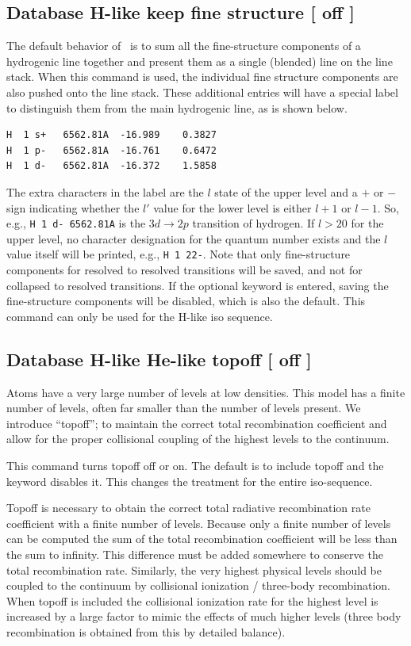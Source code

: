 \subsection{Database H-like keep fine structure [ off ]}

The default behavior of \Cloudy\ is to sum all the fine-structure components
of a hydrogenic line together and present them as a single (blended) line on
the line stack. When this command is used, the individual fine structure
components are also pushed onto the line stack. These additional entries will
have a special label to distinguish them from the main hydrogenic line, as is
shown below.

\begin{verbatim}
H  1 s+   6562.81A  -16.989    0.3827
H  1 p-   6562.81A  -16.761    0.6472
H  1 d-   6562.81A  -16.372    1.5858
\end{verbatim}

The extra characters in the label are the $l$ state of the upper level and a
$+$ or $-$ sign indicating whether the $l'$ value for the lower level is
either $l+1$ or $l-1$. So, e.g., \verb=H 1 d- 6562.81A= is the $3d \rightarrow
2p$ transition of hydrogen. If $l > 20$ for the upper level, no character
designation for the quantum number exists and the $l$ value itself will be
printed, e.g., \verb=H 1 22-=. Note that only fine-structure components for
resolved to resolved transitions will be saved, and not for collapsed to
resolved transitions. If the optional keyword  is entered,
saving the fine-structure components will be disabled, which is also the
default. This command can only be used for the H-like iso sequence.

\subsection{Database H-like \OR{} He-like topoff [ off ]} 

Atoms have a very large number of levels at low densities.
This model has a finite number of levels, often far smaller than
the number of levels present.
We introduce ``topoff''; to maintain the correct total recombination coefficient and
allow for the proper collisional coupling of the highest levels to the continuum.

This command turns topoff off or on.
The default is to include topoff and the keyword  disables it.
This changes the treatment for the entire iso-sequence.

Topoff is necessary to obtain the correct total
radiative recombination rate coefficient with a finite number of levels.
Because only a finite number of levels can be computed the sum
of the total
recombination coefficient will be less than the sum to infinity.
This difference must be added somewhere to conserve the
total recombination rate.  
Similarly, the very highest physical levels should be coupled to the continuum by
collisional ionization / three-body recombination.
When topoff is included the collisional ionization rate for the highest level is increased
by a large factor to mimic the effects of much higher levels 
(three body recombination is obtained from this by detailed balance).

